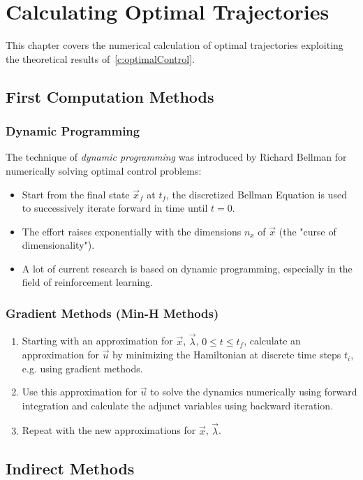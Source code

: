 \chapter{Calculating Optimal Trajectories}
	This chapter covers the numerical calculation of optimal trajectories exploiting the theoretical results of~\autoref{c:optimalControl}.

	\section{First Computation Methods}
		\subsection{Dynamic Programming}
			The technique of \emph{dynamic programming} was introduced by Richard Bellman for numerically solving optimal control problems:
			\begin{itemize}
				\item Start from the final state \(\vec{x}_f\) at \(t_f\), the discretized Bellman Equation is used to successively iterate forward in time until \( t = 0 \).
				\item The effort raises exponentially with the dimensions \(n_x\) of \(\vec{x}\) (the "curse of dimensionality").
				\item A lot of current research is based on dynamic programming, especially in the field of reinforcement learning.
			\end{itemize}

		\subsection{Gradient Methods (Min-H Methods)}
			\begin{enumerate}
				\item Starting with an approximation for \( \vec{x} \), \( \vec{\lambda} \), \( 0 \leq t \leq t_f \), calculate an approximation for \( \vec{u} \) by minimizing the Hamiltonian at discrete time steps \(t_i\), e.g. using gradient methods.
				\item Use this approximation for \(\vec{u}\) to solve the dynamics numerically using forward integration and calculate the adjunct variables using backward iteration.
				\item Repeat with the new approximations for \(\vec{x}\), \(\vec{\lambda}\).
			\end{enumerate}

	\section{Indirect Methods}
		\label{sec:indirectMethods}

